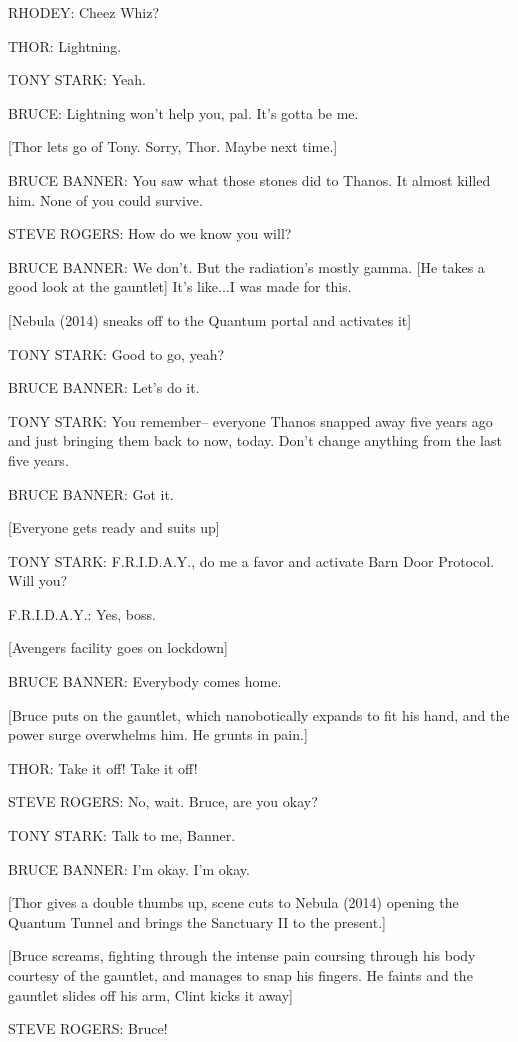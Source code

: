 RHODEY: Cheez Whiz?

THOR: Lightning.

TONY STARK: Yeah.

BRUCE: Lightning won't help you, pal. It's gotta be me.

[Thor lets go of Tony. Sorry, Thor. Maybe next time.]

BRUCE BANNER: You saw what those stones did to Thanos. It almost killed him. None of you could survive.

STEVE ROGERS: How do we know you will?

BRUCE BANNER: We don't. But the radiation's mostly gamma. [He takes a good look at the gauntlet] It's like...I was made for this.

[Nebula (2014) sneaks off to the Quantum portal and activates it]

TONY STARK: Good to go, yeah?

BRUCE BANNER: Let's do it.

TONY STARK: You remember– everyone Thanos snapped away five years ago and just bringing them back to now, today. Don't change anything from the last five years.

BRUCE BANNER: Got it.

[Everyone gets ready and suits up]

TONY STARK: F.R.I.D.A.Y., do me a favor and activate Barn Door Protocol. Will you?

F.R.I.D.A.Y.: Yes, boss.

[Avengers facility goes on lockdown]

BRUCE BANNER: Everybody comes home.

[Bruce puts on the gauntlet, which nanobotically expands to fit his hand, and the power surge overwhelms him. He grunts in pain.]

THOR: Take it off! Take it off!

STEVE ROGERS: No, wait. Bruce, are you okay?

TONY STARK: Talk to me, Banner.

BRUCE BANNER: I'm okay. I'm okay.

[Thor gives a double thumbs up, scene cuts to Nebula (2014) opening the Quantum Tunnel and brings the Sanctuary II to the present.]

[Bruce screams, fighting through the intense pain coursing through his body courtesy of the gauntlet, and manages to snap his fingers. He faints and the gauntlet slides off his arm, Clint kicks it away]

STEVE ROGERS: Bruce!

